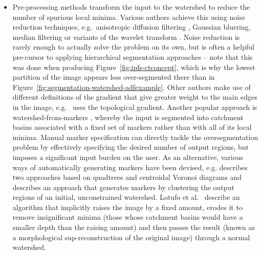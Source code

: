 \documentclass[preprint,a4paper]{elsarticle}
\begin{document}
\begin{itemize}

\item Pre-processing methods \cite{prochazka10,belaid09,meyer90,consularo07,gonzalez09,lotufo02b} transform the input to the watershed to reduce the number of spurious local minima. Various authors achieve this using noise reduction techniques, e.g.~anisotropic diffusion filtering \cite{perona90}, Gaussian blurring, median filtering or variants of the wavelet transform \cite{prochazka10}. Noise reduction is rarely enough to actually solve the problem on its own, but is often a helpful pre-cursor to applying hierarchical segmentation approaches -- note that this was done when producing Figure~\ref{fig:ipfs-ctconcept}, which is why the lowest partition of the image appears less over-segmented there than in Figure~\ref{fig:segmentation-watershed-adfexample}. Other authors make use of different definitions of the gradient that give greater weight to the main edges in the image, e.g.~\cite{belaid09} uses the topological gradient. Another popular approach is watershed-from-markers \cite{meyer90}, whereby the input is segmented into catchment basins associated with a fixed set of markers rather than with all of its local minima. Manual marker specification can directly tackle the oversegmentation problem by effectively specifying the desired number of output regions, but imposes a significant input burden on the user. As an alternative, various ways of automatically generating markers have been devised, e.g. \cite{consularo07} describes two approaches based on quadtrees and centroidal Voronoi diagrams and \cite{gonzalez09} describes an approach that generates markers by clustering the output regions of an initial, unconstrained watershed. Lotufo et al.\ \cite{lotufo02b} describe an algorithm that implicitly raises the image by a fixed amount, erodes it to remove insignificant minima (those whose catchment basins would have a smaller depth than the raising amount) and then passes the result (known as a morphological sup-reconstruction of the original image) through a normal watershed.


\end{itemize}
\end{document}
